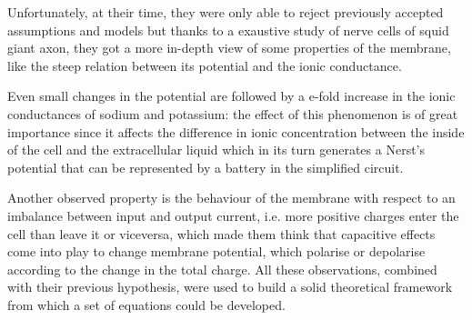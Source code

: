 \documentclass[a4paper,11pt ]{report}
\theoremstyle{definition}
\begin{document}
Unfortunately, at their time, they were only able to reject previously accepted assumptions and models but thanks to a exaustive study of nerve cells of squid giant axon, they got a more in-depth view of some properties of the membrane, like the steep relation between its potential and the ionic conductance. 

Even small changes in the potential are followed by a e-fold increase in the ionic conductances of sodium and potassium: the effect of this phenomenon is of great importance since it affects the difference in ionic concentration between the inside of the cell and the extracellular liquid which in its turn generates a Nerst's potential that can be represented by a battery in the simplified circuit. 

Another observed property is the behaviour of the membrane with respect to an imbalance between input and output current, i.e. more positive charges enter the cell than leave it or viceversa, which made them think that capacitive effects come into play to change membrane potential, which polarise or depolarise according to the change in the total charge. All these observations, combined with their previous hypothesis, were used to build a solid theoretical framework from which a set of equations could be developed.
\end{document}
